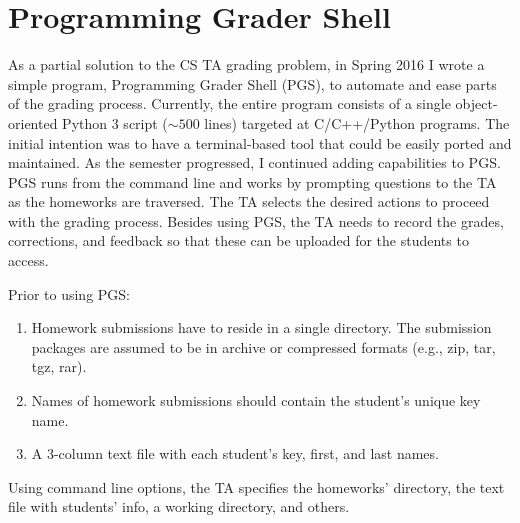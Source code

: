 \section{Programming Grader Shell}
\label{sec:pgs}

\tab As a partial solution to the CS TA grading problem, in Spring 2016
I wrote a simple program, Programming Grader Shell (PGS),
to automate and ease parts of the grading process.
Currently, the entire program consists of a single object-oriented
Python 3 script ($\sim 500$ lines) targeted at C/C++/Python programs.
The initial intention was to have a terminal-based tool
that could be easily ported and maintained.
As the semester progressed, I continued adding capabilities to PGS.
PGS runs from the command line and works by prompting questions
to the TA as the homeworks are traversed.
The TA selects the desired actions to proceed with the grading process.
Besides using PGS, the TA needs to record the grades, corrections, and feedback so
that these can be uploaded for the students to access. \par
\vspace{1em}

Prior to using PGS:
\begin{enumerate}
    \item Homework submissions have to reside in a single directory.
          The submission packages are assumed to be in archive or compressed formats
          (e.g., zip, tar, tgz, rar).
    \item Names of homework submissions should contain the student's unique key name. 
    \item A 3-column text file with each student's key, first, and last names.
\end{enumerate}

Using command line options, the TA specifies the homeworks' directory,
the text file with students' info, a working directory, and others. \par
\vspace{1em}

